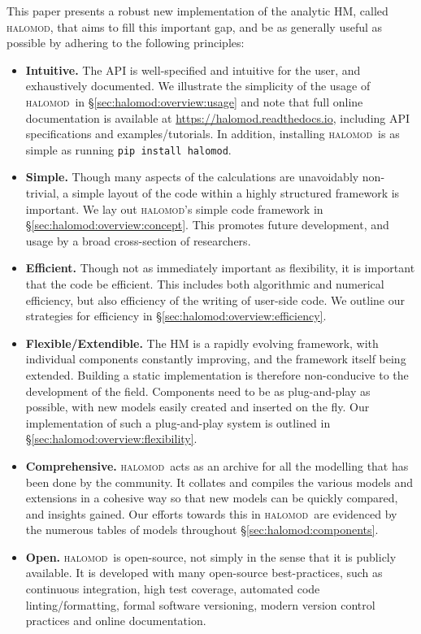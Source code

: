 \documentclass[5p]{elsarticle}
\newcommand{\halomod}{\textsc{halomod}}
\begin{document}
This paper presents a robust new implementation of the analytic HM, called \halomod,  that aims to fill this important gap, and be as generally useful as possible by adhering to the following principles:
\begin{itemize}
    \item \textbf{Intuitive.}  The API is well-specified and intuitive for the user, and exhaustively documented. We illustrate the simplicity of the usage of \halomod\ in \S\ref{sec:halomod:overview:usage} and note that full online documentation is available at \url{https://halomod.readthedocs.io}, including API specifications and examples/tutorials. In addition, installing \halomod\ is as simple as running \verb|pip install halomod|.
    
    \item \textbf{Simple.} Though many aspects of the calculations are unavoidably non-trivial, a simple layout of the code within a highly structured framework is important. We lay out \halomod's simple code framework in \S\ref{sec:halomod:overview:concept}. This promotes future development, and usage by a broad cross-section of researchers. 
    
    \item \textbf{Efficient. } Though not as immediately important as flexibility, it is important that the code be efficient. This includes both algorithmic and numerical efficiency, but also efficiency of the writing of user-side code.
    We outline our strategies for efficiency in \S\ref{sec:halomod:overview:efficiency}.
    
    \item \textbf{Flexible/Extendible. } The HM is a rapidly evolving framework, with individual components constantly improving, and the framework itself being extended. Building a static implementation is therefore non-conducive  to the development of the field. Components need to be as plug-and-play as possible, with new models easily created and inserted on the fly. Our implementation of 
    such a plug-and-play system is outlined in \S\ref{sec:halomod:overview:flexibility}.
    
    \item \textbf{Comprehensive. } \halomod\ acts as an archive for all the modelling that has been done by the community. It collates and compiles the various models and extensions in a cohesive way so that new models can be quickly compared, and insights gained. Our efforts towards this in \halomod\ are evidenced by the numerous tables of models throughout \S\ref{sec:halomod:components}.
    
    \item \textbf{Open. } \halomod\ is open-source, not simply in the sense that it is publicly available. It is developed with many open-source best-practices, such as continuous integration, high test coverage, automated code linting/formatting, formal software versioning, modern version control practices and online documentation. 
\end{itemize}
\end{document}
